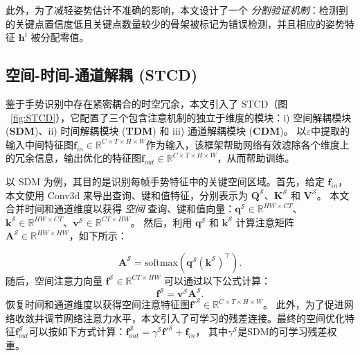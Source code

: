 此外，为了减轻姿势估计不准确的影响，本文设计了一个 \emph{分割验证机制}：检测到的关键点置信度低且关键点数量较少的骨架被标记为错误检测，并且相应的姿势特征 $\mathbf{h}^{i}$ 被分配零值。%

\subsection{空间-时间-通道解耦 (STCD)}
\label{sec:STCD}
鉴于手势识别中存在紧密耦合的时空冗余\cite{zhou2023unified}，本文引入了 STCD（图 ~\ref{fig:STCD}），它配置了三个包含注意机制的独立于维度的模块：i) 空间解耦模块 (\textbf{SDM})、ii) 时间解耦模块 (\textbf{TDM}) 和 iii) 通道解耦模块 (\textbf{CDM})。
以$\varepsilon$中提取的输入中间特征图$\mathbf{f}_{in}\in \mathbb{R}^{C\times T\times H\times W}$作为输入，该框架帮助网络有效滤除各个维度上的冗余信息，输出优化的特征图$\mathbf{f}_{out}\in \mathbb{R}^{C\times T\times H\times W}$，从而帮助训练。

以 SDM 为例，其目的是识别每帧手势特征中的关键空间区域。首先，给定 $\mathbf{f}_{in}$，本文使用 Conv3d 来导出查询、键和值特征，分别表示为 $\mathbf{Q}^{\mathcal{S}}$、$\mathbf{K}^{\mathcal{S}}$ 和 $\mathbf{V}^{\mathcal{S}}$。
本文合并时间和通道维度以获得 \emph{空间} 查询、键和值向量：$\mathbf{q}^{\mathcal{S}}\in \mathbb{R}^{HW\times CT}$、$\mathbf{k}^{\mathcal{S}}\in \mathbb{R}^{HW\times CT}$、$\mathbf{v}^{\mathcal{S}}\in \mathbb{R}^{CT\times HW}$。
然后，利用 $\mathbf{q}^{\mathcal{S}}$ 和 $\mathbf{k}^{\mathcal{S}}$ 计算注意矩阵 $\mathbf{A}^{\mathcal{S}}\in \mathbb{R}^{HW\times HW}$，如下所示：

\begin{equation}
\mathbf{A}^{\mathcal{S}} = \text{softmax}\left(\mathbf{q}^{\mathcal{S}}\left(\mathbf{k}^{\mathcal{S}}\right)^{\top}\right).
\end{equation}
随后，空间注意力向量 $\mathbf{f}^{\mathcal{S}}\in \mathbb{R}^{CT\times HW}$ 可以通过以下公式计算：
\begin{equation}
\mathbf{f}^{\mathcal{S}} = \mathbf{v}^{\mathcal{S}} \mathbf{A}^{\mathcal{S}}.
\end{equation}
恢复时间和通道维度以获得空间注意特征图$\mathbf{f}'^{\mathcal{S}}\in \mathbb{R}^{C\times T\times H\times W}$。
此外，为了促进网络收敛并调节网络注意力水平，本文引入了可学习的残差连接。最终的空间优化特征$\mathbf{f}_{out}^{\mathcal{S}}$可以按如下方式计算：$\mathbf{f}_{out}^{\mathcal{S}} = \gamma^{\mathcal{S}} \mathbf{f}'^{\mathcal{S}} + \mathbf{f}_{in}$，
其中$\gamma^{\mathcal{S}}$是SDM的可学习残差权重。

